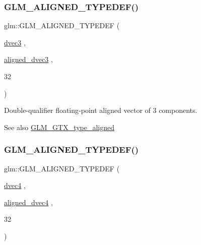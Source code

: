 \subsubsection{\texorpdfstring{G\+L\+M\+\_\+\+A\+L\+I\+G\+N\+E\+D\+\_\+\+T\+Y\+P\+E\+D\+E\+F()}{GLM\_ALIGNED\_TYPEDEF()}\hspace{0.1cm}{\footnotesize\ttfamily [157/209]}}
{\footnotesize\ttfamily glm\+::\+G\+L\+M\+\_\+\+A\+L\+I\+G\+N\+E\+D\+\_\+\+T\+Y\+P\+E\+D\+EF (\begin{DoxyParamCaption}\item[{\hyperlink{group__core__types_ga7f3287f952e6ccb481231368091702ac}{dvec3}}]{,  }\item[{\hyperlink{group__gtc__type__aligned_ga82da11893fbac3bda647c9de9da62693}{aligned\+\_\+dvec3}}]{,  }\item[{32}]{ }\end{DoxyParamCaption})}

Double-\/qualifier floating-\/point aligned vector of 3 components. \begin{DoxySeeAlso}{See also}
\hyperlink{group__gtx__type__aligned}{G\+L\+M\+\_\+\+G\+T\+X\+\_\+type\+\_\+aligned} 
\end{DoxySeeAlso}
\mbox{\label{group__gtx__type__aligned_ga687d5b8f551d5af32425c0b2fba15e99}} 
\subsubsection{\texorpdfstring{G\+L\+M\+\_\+\+A\+L\+I\+G\+N\+E\+D\+\_\+\+T\+Y\+P\+E\+D\+E\+F()}{GLM\_ALIGNED\_TYPEDEF()}\hspace{0.1cm}{\footnotesize\ttfamily [158/209]}}
{\footnotesize\ttfamily glm\+::\+G\+L\+M\+\_\+\+A\+L\+I\+G\+N\+E\+D\+\_\+\+T\+Y\+P\+E\+D\+EF (\begin{DoxyParamCaption}\item[{\hyperlink{group__core__types_ga0824ceed7ec3b2fba89765501c1540b5}{dvec4}}]{,  }\item[{\hyperlink{group__gtc__type__aligned_ga502d8d084a488118c9a5466d73ba1a46}{aligned\+\_\+dvec4}}]{,  }\item[{32}]{ }\end{DoxyParamCaption})}

